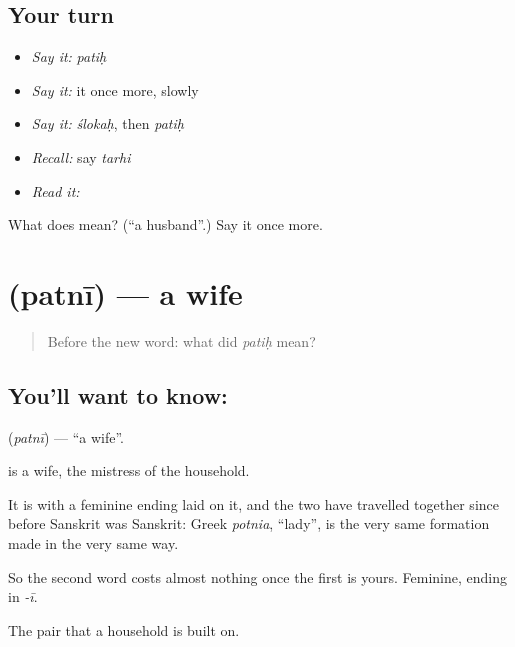 \subsection*{Your turn}
\begin{itemize}
\raggedright
  \item \emph{Say it:} \emph{patiḥ}
  \item \emph{Say it:} it once more, slowly
  \item \emph{Say it:} \emph{ślokaḥ}, then \emph{patiḥ}
  \item \emph{Recall:} say \emph{tarhi}
  \item \emph{Read it:} \textbf{}
\end{itemize}

\begin{tcolorbox}[breakable,colback=teal!4,colframe=teal!35!black,title={Before you move on}]
What does  mean? (\textquotedblleft{}a husband\textquotedblright{}.) Say it once more.
\end{tcolorbox}
\section[\texorpdfstring{\sk{पत्नी} (patnī)}{पत्नी (patnī)}]{ (patnī) — a wife}

\label{lesson:SA-C51-wife}



\begin{quote}
Before the new word: what did \emph{patiḥ} mean?
\end{quote}

\subsection*{You'll want to know: }
\textbf{} (\emph{patnī}) — \textquotedblleft{}a wife\textquotedblright{}.

\textbf{} is a wife, the mistress of the household.

It is  with a feminine ending laid on it, and the two have travelled together since before Sanskrit was Sanskrit: Greek \emph{potnia}, \textquotedblleft{}lady\textquotedblright{}, is the very same formation made in the very same way.

So the second word costs almost nothing once the first is yours. Feminine, ending in \emph{-ī}.

\begin{grammarlens}[title={What you've built}]
The pair that a household is built on.
\end{grammarlens}

